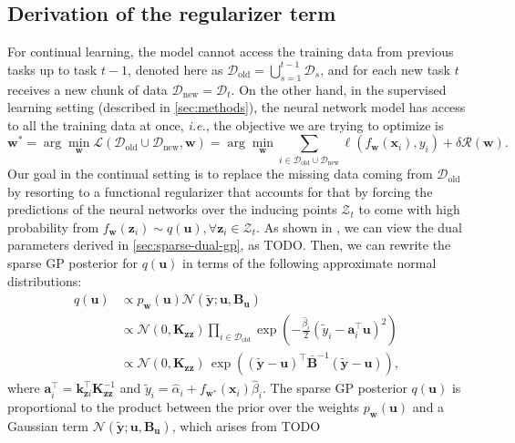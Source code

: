 \documentclass{article}
\makeatletter
\newcommand{\ie}{\textit{i.e.\@}\xspace}
\newcommand{\dataset}{\ensuremath{\mathcal{D}}}
\newcommand{\weights}{\ensuremath{\mathbf{w}}}
\newcommand{\mbf}[1]{\mathbf{#1}}
\newcommand{\MB}{\mbf{B}}
\newcommand{\vz}{\mbf{z}}
\newcommand{\vu}{\mbf{u}}
\newcommand{\vx}{\mbf{x}}
\newcommand{\vy}{\mbf{y}}
\newcommand{\vw}{\mbf{w}}
\newcommand{\va}{\mbf{a}}
\newcommand{\MKzz}{\mbf{K}_{\mbf{z}\mbf{z}}}
\newcommand{\vkzi}{\mbf{k}_{\mbf{z}i}}
\newcommand{\Norm}{\mathcal{N}}
\makeatother
\begin{document}
\subsection{Derivation of the regularizer term}
For continual learning, the model cannot access the training data from previous tasks up to task $t-1$, denoted here as $\dataset_\textrm{old} = \bigcup_{s=1}^{t-1} \dataset_s$, and for each new task $t$ receives a new chunk of data $\dataset_\textrm{new} = \dataset_t$. On the other hand, in the supervised learning setting (described in \cref{sec:methods}), the neural network model has access to all the training data at once, \ie, the objective we are trying to optimize is
\begin{equation}
	\weights^* = \arg \min_\weights \mathcal{L}(\dataset_\textrm{old} \cup \dataset_\textrm{new}, \weights) = \arg \min_\weights \sum_{i \in \dataset_\textrm{old} \cup \dataset_\textrm{new}}\ell(f_\weights(\mathbf{x}_{i}), y_i) + \delta \mathcal{R}(\weights).
\end{equation} 
Our goal in the continual setting is to replace the missing data coming from $\dataset_\textrm{old}$ by resorting to a functional regularizer that accounts for that by forcing the predictions of the neural networks over the inducing points $\mathcal{Z}_t$ to come with high probability from $f_\weights(\vz_i) \sim q(\vu),  \forall \vz_i \in \mathcal{Z}_t$. As shown in \citep{khan2017conjugate, adam2021dual}, we can view the dual parameters derived in \cref{sec:sparse-dual-gp}, as {\color{red} TODO}. Then, we can rewrite the sparse GP posterior for $q(\vu)$ in terms of the following approximate normal distributions:
%
\begin{align}
	q(\vu)
	& \propto p_\weights(\vu) \Norm(\tilde{\vy}; \vu, \MB_\vu)\\
	& \propto  \Norm(0, \MKzz) \prod_{i \in \dataset_\textrm{old}} \exp \! \left(-\frac{\hat{\beta}_i}{2}(\tilde{y}_i - \va_i^\top \vu)^2 \right) \\
	& \propto \Norm(0, \MKzz) \, \exp\left((\tilde{\vy} - \vu)^\top \bar{\MB}^{-1}(\tilde{\vy} - \vu)\right),
\end{align}
where $\va_i^\top = \vkzi^\top \MKzz^{-1}$ and $\tilde{y}_i = \hat{\alpha}_i + f_{\vw^*}(\vx_i)\hat{\beta}_i$.
The sparse GP posterior $q(\vu)$ is proportional to the product between the prior over the weights $p_\weights(\vu)$ and a Gaussian term $\Norm(\tilde{\vy}; \vu, \MB_\vu)$, which arises from {\color{red} TODO}
 
\end{document}
